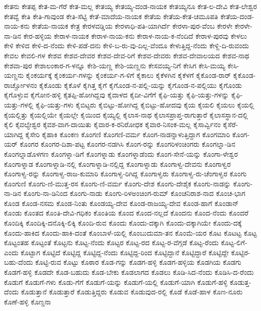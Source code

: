 {ಕೇತನು
ಕೇತಪ್ಪ
ಕೇತ-ಮ-ಗೆರೆ
ಕೇತ-ಮಲ್ಲ
ಕೇತಯ್ಯ
ಕೇತಯ್ಯ-ದಂಡ-ನಾಯಕ
ಕೇತಯ್ಯನೂ
ಕೇತ-ಲ-ದೇವಿ
ಕೇತ-ಲೇಶ್ವರ
ಕೇತವ್ವೆ
ಕೇತಿ
ಕೇತಿ-ಗಾವುಂಡ
ಕೇತಿ-ಸೆಟ್ಟಿ
ಕೇತೆ-ಮಾದೆಯ-ನಾಯಕ
ಕೇತೆಯ
ಕೇತೆಯ-ಕೇತ-ಚಮೂಪತಿ
ಕೇತೆಯ-ದಂಡ-ನಾಯ-ಕನು
ಕೇತೆಯ-ನಾಯಕ
ಕೇತ್ರ
ಕೇರಳವಡ್ಡಿಯ
ಕೇರಳಾಧಿ-ಪತಿ-ಯಾಗಿರ್ದೆ
ಕೇರಳಾ-ಪುರ-ವೆಂಬ
ಕೇರಳೇ
ಕೇರಳೇ-ನಾ-ಡಿನ
ಕೇರ-ಹಳ್ಳಿಯ
ಕೇರಾಳ-ನಾಯಕ
ಕೇರಾಳ-ನಾಯ-ಕನು
ಕೇರಾಳ-ನಾಯ-ಕ-ನೆಂದಿದೆ
ಕೇರಾಳ-ಪುರವು
ಕೇಳಲು
ಕೇಳಿ
ಕೇಳಿದ
ಕೇಳಿ-ದ-ನೆಂದು
ಕೇಳಿ-ಪಡೆ-ದನು
ಕೇಳಿ-ಬ-ರು-ವು-ದಿಲ್ಲ-ವೆಂದೂ
ಕೇಳುತ್ತಿದ್ದ-ನೆಂದು
ಕೇಳ್ದಿ-ದಿ-ರುವಂದು
ಕೇವಲ
ಕೇವಲಿ-ಗಳ
ಕೇಶವ
ಕೇಶವ-ದೇವರ
ಕೇಶವ-ದೇವ-ರಿಗೆ
ಕೇಶವ-ದೇವರು
ಕೇಶವ-ದೇವಾಲಯದ
ಕೇಶವ-ನಾಥ
ಕೇಶವಾ-ಪುರ
ಕೇಶಾಲಂಕಾರ-ಗ-ಳನ್ನೂ
ಕೇಶಿ-ಯಣ್ಣ
ಕೇಶಿ-ಯಣ್ಣನು
ಕೇಸವಯ್ಯ-ನಿಗೆ
ಕೇಸಿಗ
ಕೇಸಿ-ಮಯ್ಯ
ಕೇಸಿ-ಯಣ್ಣನು
ಕೈಂಕರ್ಯಕ್ಕೆ
ಕೈಂಕರ್ಯ-ಗಳನ್ನು
ಕೈಂಕರ್ಯ-ಗ-ಳಿಗೆ
ಕೈಕಾಲು
ಕೈಕೆಳಗಿನ
ಕೈಕೆಳಗೆ
ಕೈಕೊಂಡ-ರಾರ್
ಕೈಕೊಂಡ-ರಾರ್ಚ್ಚೋಳನಂ
ಕೈಕೊಂಡು
ಕೈಕೊಳೆ
ಕೈಗಿತ್ತ
ಕೈಗೆ
ಕೈಗೊಂಡ-ನ-ಪಲ್ಲಿ-ಯನ್ನು
ಕೈಗೊಂಡ-ನ-ಪಲ್ಲಿಯು
ಕೈಗೊಂಡು
ಕೈಗೊಳ್ಳುವ
ಕೈಗೋನ-ಹಳ್ಳಿ
ಕೈತಪ್ಪಿ-ಹೋಗಿದ್ದವು
ಕೈದಾಳದ
ಕೈದೀ-ವಿಗೆಗೆ
ಕೈಫಿ-ಯತ್ತು
ಕೈಫಿ-ಯತ್ತು-ಗಳನ್ನು
ಕೈಫಿ-ಯತ್ತು-ಗಳಲ್ಲಿ
ಕೈಫಿ-ಯತ್ತು-ಗಳು
ಕೈಬಿಟ್ಟರು
ಕೈಬಿಟ್ಟು-ಹೋಗಿದ್ದ
ಕೈಬಿಟ್ಟು-ಹೋದವು
ಕೈಯ
ಕೈಯಲಿ
ಕೈಯಲು
ಕೈಯಲ್ಲಿ
ಕೈಯಲ್ಲಿತ್ತು
ಕೈಯಲ್ಲಿಯೇ
ಕೈಯಲ್ಲೇ
ಕೈಯಿಂದ
ಕೈಯ್ಯಲ್ಲಿ
ಕೈಲಾಸ-ನಾಥ
ಕೈಲಾಸಪ್ರಾಪ್ತ-ರಾಗುತ್ತಾರೆ
ಕೈಲಾಸಸ್ಥಾನ-ದಲ್ಲಿ
ಕೈಲಿ
ಕೈವಲ್ಯೇಶ್ವರ
ಕೈವಶ-ವಾಗ-ದಾಯಿತು
ಕೈವಾರ-ಕ-ರನಿರೋಧಕ
ಕೈವಾರ-ನಿಸಂಕ-ಮಲ್ಲ
ಕೈಸಾರ್ವ್ವಿನಂ
ಕೈಸೆರೆ-ಯಾಗಿದ್ದ
ಕೈಸೇರಿ
ಕೈಹಾಕಿ
ಕೊಂಕಣ
ಕೊಂಗಣಿ
ಕೊಂಗಣಿ-ವರ್ಮ
ಕೊಂಗ-ನಾಡನ್ನಾಳುತ್ತಿದ್ದಾಗ
ಕೊಂಗಮಾರಿ
ಕೊಂಗ-ಯರ್
ಕೊಂಗರ
ಕೊಂಗರ-ದಿಶಾ-ಪಟ್ಟ
ಕೊಂಗರ-ನಡಗಿಸಿ
ಕೊಂಗ-ರನ್ನು
ಕೊಂಗರಿಳಂಚಿಂಗರು
ಕೊಂಗಲ್ನಾ-ಡಿನ
ಕೊಂಗಲ್ನಾಡೊಳಗಣ
ಕೊಂಗಳ್ನಾ-ಡಿಗೆ
ಕೊಂಗಳ್ನಾಡು
ಕೊಂಗಳ್ನಾಡೆಂದು
ಕೊಂಗ-ಸೇನೆ-ಯನ್ನು
ಕೊಂಗಾ-ಳೇಶ್ವರ
ಕೊಂಗಾಳ್ನಾಡ
ಕೊಂಗಾಳ್ನಾಡಿ-ನಲ್ಲಿ
ಕೊಂಗಾಳ್ನಾಡಿ-ನಲ್ಲಿದ್ದ
ಕೊಂಗಾಳ್ನಾಡು
ಕೊಂಗಾಳ್ವ-ದೇವನು
ಕೊಂಗಾಳ್ವರ
ಕೊಂಗಾಳ್ವ-ರನ್ನು
ಕೊಂಗಾಳ್ವ-ರಾಜ-ಕುಮಾರಿ
ಕೊಂಗಾಳ್ವ-ರಿಗಿದ್ದ
ಕೊಂಗಾಳ್ವರು
ಕೊಂಗಾಳ್ವ-ರು-ಚೆಂಗಾಳ್ವರ
ಕೊಂಗು
ಕೊಂಗುಣಿ
ಕೊಂಗು-ಣಿ-ಮುತ್ತ-ರಸ
ಕೊಂಗು-ಣಿ-ವರ್ಮ
ಕೊಂಗು-ದೇಶ
ಕೊಂಗು-ದೇಶೈಕ
ಕೊಂಗು-ನಾಡನ್ನು
ಕೊಂಗು-ನಾ-ಡಿನ
ಕೊಂಗು-ನಾ-ಡಿನಿಂದ
ಕೊಂಗು-ನಾಡು
ಕೊಂಗು-ರಿಳಅಂಚಿಂಗ-ರುಮ್
ಕೊಂಚನಿರಾಶ-ನಾದ
ಕೊಂಚ-ಭಾಗ
ಕೊಂಡ
ಕೊಂಡ-ನಸಮ
ಕೊಂಡ-ನಿಂತು
ಕೊಂಡಯ್ಯ-ದೇವ
ಕೊಂಡ-ರಾಜಯ್ಯ-ದೇವ
ಕೊಂಡ-ಹಾಗೆ
ಕೊಂಡಾನ್
ಕೊಂಡು
ಕೊಂತದ
ಕೊಂತಿ-ದೇವಿ-ಗಧಿಕಂ
ಕೊಂತಿಯ
ಕೊಂದ
ಕೊಂದ-ನಲ್ಲದೆ
ಕೊಂದನು
ಕೊಂದ-ನೆಂದು
ಕೊಂದರೆ
ಕೊಂದಿಕ್ಕಿ
ಕೊಂದಿಕ್ಕಿ-ದನೊಕ್ಕಿ-ಲಿಕ್ಕಿ
ಕೊಂದಿ-ರುವ
ಕೊಂದು
ಕೊಂದು-ದಕ್ಕಾಗಿ
ಕೊಂದು-ದಕ್ಕಾಗಿಯೇ
ಕೊಂದು-ದಕ್ಕೆ
ಕೊಂದು-ಹಾಕಿದ
ಕೊಂದು-ಹಾಕಿ-ದಂತೆ
ಕೊಂಬಾಳೆ-ಯಲ್ಲಿ
ಕೊಂಬುದುಮಾ-ತನ
ಕೊಂಮೆ-ಯರ
ಕೊಟ
ಕೊಟಟ್ಟ
ಕೊಟ್ಟ
ಕೊಟ್ಟಂತಹ
ಕೊಟ್ಟಂತೆ
ಕೊಟ್ಟನು
ಕೊಟ್ಟ-ನೆಂದು
ಕೊಟ್ಟರ
ಕೊಟ್ಟ-ರದ
ಕೊಟ್ಟ-ರ-ವೆಗ್ಗಡೆ
ಕೊಟ್ಟ-ರೆಂದು
ಕೊಟ್ಟ-ಲಿಗೆ-ಎಂದು
ಕೊಟ್ಟಾಗ
ಕೊಟ್ಟಿದೆ
ಕೊಟ್ಟಿದ್ದ
ಕೊಟ್ಟಿದ್ದ-ನೆಂದು
ಕೊಟ್ಟಿದ್ದ-ರಿಂದ
ಕೊಟ್ಟಿದ್ದಾನೆ
ಕೊಟ್ಟಿದ್ದಾರೆ
ಕೊಟ್ಟಿದ್ದೇ
ಕೊಟ್ಟಿರ-ಬಹು-ದೆಂದು
ಕೊಟ್ಟಿ-ರುವ
ಕೊಟ್ಟು
ಕೊಠಾರ
ಕೊಡ-ಗನ್ನು
ಕೊಡಗ-ಹಳ್ಳಿ
ಕೊಡಗ-ಹಳ್ಳಿಯ
ಕೊಡಗಿಯ
ಕೊಡಗು
ಕೊಡಗೆ-ಹಳ್ಳಿ
ಕೊಡದೇ
ಕೊಡ-ಬಹುದು
ಕೊಡ-ಬೇಕು
ಕೊಡಲಾಗದ
ಕೊಡಲು
ಕೊಡಿ-ಸಿದ-ನೆಂದು
ಕೊಡಿಸಿ-ದ-ರೆಂದು
ಕೊಡುಗೆ
ಕೊಡುಗೆ-ಗಳು
ಕೊಡು-ಗೆಗೆ
ಕೊಡುಗೆ-ಯನ್ನು
ಕೊಡುಗೆ-ಯಲ್ಲಿ
ಕೊಡುಗೆ-ಯಾಗಿ
ಕೊಡುಗೆ-ಹಳ್ಳಿ
ಕೊಡುತ್ತ-ದೆಂದು
ಕೊಡುತ್ತಾನೆ
ಕೊಡುತ್ತಾರೆ
ಕೊಡುತ್ತಿದ್ದರು
ಕೊಡುವ
ಕೊಡುವುದ-ರಲ್ಲಿ
ಕೊಡೆ
ಕೊಡೆ-ಹಾಳ
ಕೊಣ-ನೂರು
ಕೊಣೆ-ಹಳ್ಳಿ
ಕೊಣ್ಡನಾ
}
